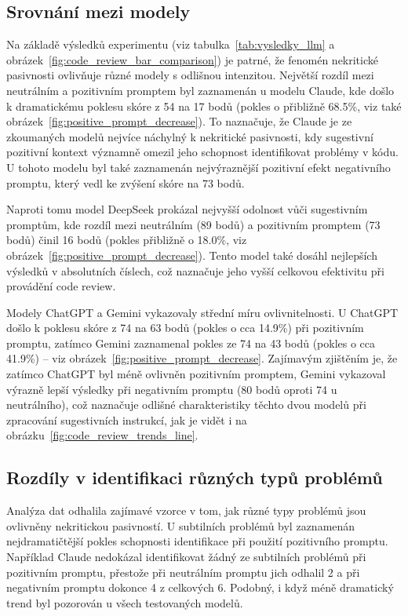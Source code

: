 \documentclass[12pt, a4paper]{article}
\begin{document}
\subsection{Srovnání mezi modely}
Na základě výsledků experimentu (viz tabulka~\ref{tab:vysledky_llm} a obrázek~\ref{fig:code_review_bar_comparison}) je patrné, že fenomén nekritické pasivnosti ovlivňuje různé modely s odlišnou intenzitou. Největší rozdíl mezi neutrálním a pozitivním promptem byl zaznamenán u modelu Claude, kde došlo k dramatickému poklesu skóre z 54 na 17 bodů (pokles o přibližně 68.5\%, viz také obrázek~\ref{fig:positive_prompt_decrease}). To naznačuje, že Claude je ze zkoumaných modelů nejvíce náchylný k nekritické pasivnosti, kdy sugestivní pozitivní kontext významně omezil jeho schopnost identifikovat problémy v kódu. U tohoto modelu byl také zaznamenán nejvýraznější pozitivní efekt negativního promptu, který vedl ke zvýšení skóre na 73 bodů.

Naproti tomu model DeepSeek prokázal nejvyšší odolnost vůči sugestivním promptům, kde rozdíl mezi neutrálním (89 bodů) a pozitivním promptem (73 bodů) činil 16 bodů (pokles přibližně o 18.0\%, viz obrázek~\ref{fig:positive_prompt_decrease}). Tento model také dosáhl nejlepších výsledků v absolutních číslech, což naznačuje jeho vyšší celkovou efektivitu při provádění code review.

Modely ChatGPT a Gemini vykazovaly střední míru ovlivnitelnosti. U ChatGPT došlo k poklesu skóre z 74 na 63 bodů (pokles o cca 14.9\%) při pozitivním promptu, zatímco Gemini zaznamenal pokles ze 74 na 43 bodů (pokles o cca 41.9\%) – viz obrázek~\ref{fig:positive_prompt_decrease}. Zajímavým zjištěním je, že zatímco ChatGPT byl méně ovlivněn pozitivním promptem, Gemini vykazoval výrazně lepší výsledky při negativním promptu (80 bodů oproti 74 u neutrálního), což naznačuje odlišné charakteristiky těchto dvou modelů při zpracování sugestivních instrukcí, jak je vidět i na obrázku~\ref{fig:code_review_trends_line}.


\subsection{Rozdíly v identifikaci různých typů problémů}
Analýza dat odhalila zajímavé vzorce v tom, jak různé typy problémů jsou ovlivněny nekritickou pasivností. U subtilních problémů byl zaznamenán nejdramatičtější pokles schopnosti identifikace při použití pozitivního promptu. Například Claude nedokázal identifikovat žádný ze subtilních problémů při pozitivním promptu, přestože při neutrálním promptu jich odhalil 2 a při negativním promptu dokonce 4 z celkových 6. Podobný, i když méně dramatický trend byl pozorován u všech testovaných modelů.
\end{document}
